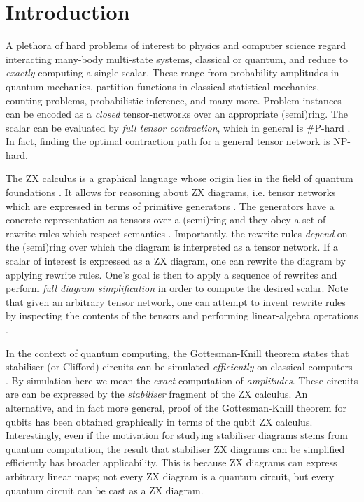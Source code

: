 \section{Introduction}


A plethora of hard problems of interest to physics and computer science
regard interacting many-body multi-state systems, classical or quantum,
and reduce to \emph{exactly} computing a single scalar.
These range from probability amplitudes in quantum mechanics,
partition functions in classical statistical mechanics,
counting problems, probabilistic inference, and many more.
Problem instances can be encoded as a \emph{closed}
tensor-networks over an appropriate (semi)ring.
The scalar can be evaluated by \emph{full tensor contraction},
which in general is \#P-hard \cite{Damm2002}.
In fact, finding the optimal contraction path for a general tensor network is NP-hard.

The ZX calculus is a graphical language whose origin lies in the field of quantum foundations \cite{Coecke2011}.
It allows for reasoning about ZX diagrams, i.e. tensor networks which are expressed in terms of primitive generators \cite{vandewetering2020zxcalculus}.
The generators have a concrete representation as tensors over
a (semi)ring and they obey a set of rewrite rules which respect semantics \cite{wang2020completeness}.
Importantly, the rewrite rules \emph{depend} on the (semi)ring over which the diagram is interpreted as a tensor network.
If a scalar of interest is expressed as a ZX diagram,
one can rewrite the diagram by applying rewrite rules.
One's goal is then to apply a sequence of rewrites and perform \emph{full diagram simplification} in order to compute the desired scalar.
Note that
given an arbitrary tensor network, one can attempt to invent rewrite rules by inspecting the contents of the tensors and performing linear-algebra operations \cite{gray2020hyperoptimized}.

In the context of quantum computing,
the Gottesman-Knill theorem states that stabiliser (or Clifford) circuits can be
simulated \emph{efficiently} on classical computers \cite{Aaronson2004}.
By simulation here we mean the \emph{exact} computation of \emph{amplitudes}.
These circuits are can be expressed by the \emph{stabiliser} fragment of the ZX calculus.
An alternative, and in fact more general, proof of the Gottesman-Knill theorem for qubits has been obtained graphically in terms of the qubit ZX calculus.
Interestingly, even if the motivation for studying stabiliser diagrams stems from quantum computation, the result that stabiliser ZX diagrams can be simplified efficiently has broader applicability. This is because
ZX diagrams can express arbitrary linear maps; not every ZX diagram is a quantum circuit, but every quantum circuit can be cast as a ZX diagram.

